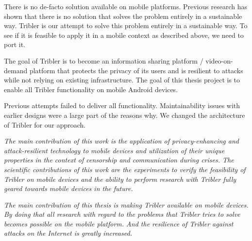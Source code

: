 


There is no de-facto solution available on mobile platforms. \cite{literature_survey}
Previous research has shown that there is no solution that solves the problem entirely in a sustainable way.
Tribler is our attempt to solve this problem entirely in a sustainable way.
To see if it is feasible to apply it in a mobile context as described above, we need to port it.


The goal of Tribler is to become an information sharing platform / video-on-demand platform that protects the privacy of its users and is resilient to attacks while not relying on existing infrastructure.
The goal of this thesis project is to enable all Tribler functionality on mobile Android devices.


Previous attempts failed to deliver all functionality. \cite{bsc_1,2,3}
Maintainability issues with earlier designs were a large part of the reasons why.
We changed the architecture of Tribler for our approach.


\emph{
The main contribution of this work is the application of privacy-enhancing and attack-resilient technology to mobile devices and utilization of their unique properties in the context of censorship and communication during crises.
The scientific contributions of this work are the experiments to verify the feasibility of Tribler on mobile devices and the ability to perform research with Tribler fully geared towards mobile devices in the future.
}

\emph{
The main contribution of this thesis is making Tribler available on mobile devices.
By doing that all research with regard to the problems that Tribler tries to solve becomes possible on the mobile platform.
And the resilience of Tribler against attacks on the Internet is greatly increased.
}

